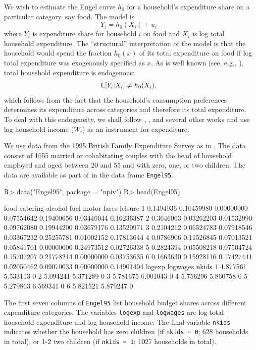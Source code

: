 \documentclass[
]{jss}
\begin{document}
We wish to estimate the Engel curve \(h_0\) for a household's
expenditure share on a particular category, say food. The model is \[
 Y_i = h_0(X_i) + u_i
\] where \(Y_i\) is expenditure share for household \(i\) on food and
\(X_i\) is log total household expenditure. The ``structural''
interpretation of the model is that the household would spend the
fraction \(h_0(x)\) of its total expenditure on food if log total
expenditure was exogenously specified as \(x\). As is well known (see,
e.g., \citet{BBL}), total household expenditure is endogenous: \[
 \mathsf{E}[Y_i | X_i] \neq h_0(X_i),
\] which follows from the fact that the household's consumption
preferences determines its expenditure across categories and therefore
its total expenditure. To deal with this endogeneity, we shall follow
\citet{BBL}, \citet{BCK}, and several other works and use log household
income (\(W_i\)) as an instrument for expenditure.

We use data from the 1995 British Family Expenditure Survey as in
\citet{BCK}. The data consist of 1655 married or cohabitating couples
with the head of household employed and aged between 20 and 55 and with
zero, one, or two children. The data are available as part of 
in the data frame \texttt{Engel95}.

\begin{CodeChunk}
\begin{CodeInput}
R> data("Engel95", package = "npiv")
R> head(Engel95)
\end{CodeInput}
\begin{CodeOutput}
       food   catering    alcohol       fuel      motor      fares    leisure
1 0.1494936 0.10459980 0.00000000 0.07554642 0.19400656 0.03446044 0.16236387
2 0.3646063 0.03262203 0.01532990 0.09762080 0.19944200 0.03679176 0.13520971
3 0.2104212 0.06524783 0.07918546 0.03367232 0.25255781 0.01002152 0.17813644
4 0.0786906 0.11526845 0.07013521 0.05841701 0.00000000 0.24973512 0.02726338
5 0.2824394 0.05508218 0.07504724 0.15707207 0.21778214 0.00000000 0.03753635
6 0.1663630 0.15928116 0.17427441 0.02050462 0.09070033 0.00000000 0.14901404
    logexp logwages nkids
1 4.877561 5.533113     0
2 5.094241 5.371289     0
3 5.781675 6.001043     0
4 5.756296 5.860758     0
5 5.279863 6.569341     0
6 5.821521 5.879247     0
\end{CodeOutput}
\end{CodeChunk}

The first seven columns of \texttt{Engel95} list household budget shares
across different expenditure categories. The variables \texttt{logexp}
and \texttt{logwages} are log total household expenditure and log
household income. The final variable \texttt{nkids} indicates whether
the household has zero children (if \texttt{nkids\ =\ 0}; 628 households
in total), or 1-2 two children (if \texttt{nkids\ =\ 1}; 1027 households
in total).
\end{document}
